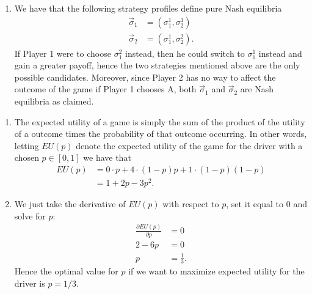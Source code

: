 \documentclass[a4paper]{article}
\begin{document}
\begin{exercise}{3}
\begin{enumerate}[label=(\alph*)]
    \item We have that the following strategy profiles define pure Nash equilibria
      \begin{align*}
        \vec{\sigma}_1 &= (\sigma_1^{1}, \sigma_2^{1}) \\
        \vec{\sigma}_2 &= (\sigma_1^{1}, \sigma_2^{2})
      .\end{align*}
      If Player 1 were to choose $ \sigma_1^{2} $ instead, then he could switch to $ \sigma_1^{1} $ instead and gain a greater payoff, hence the two strategies mentioned above are the only possible candidates. Moreover, since Player 2 has no way to affect the outcome of the game if Player 1 chooses A, both $ \vec{\sigma}_1 $ and $ \vec{\sigma}_2 $ are Nash equilibria as claimed.
  \end{enumerate}
\end{exercise}

\begin{exercise}{4}
  \begin{enumerate}[label=(\alph*)]
    \item The expected utility of a game is simply the sum of the product of the utility of a outcome times the probability of that outcome occurring. In other words, letting $ EU(p) $ denote the expected utility of the game for the driver with a chosen $ p \in [0, 1] $ we have that
    \begin{align*}
      EU(p) &= 0 \cdot p + 4 \cdot (1- p)p + 1 \cdot (1-p)(1-p) \\
            &= 1 + 2p - 3p^2
    .\end{align*}

    \item We just take the derivative of $ EU(p) $ with respect to $ p $, set it equal to $ 0 $ and solve for $ p $:
      \begin{align*}
        \frac{\partial EU(p)}{\partial p} &= 0 \\
        2 - 6p &= 0 \\
        p &= \frac{1}{3}.
      \end{align*}
      Hence the optimal value for $ p $ if we want to maximize expected utility for the driver is $ p=1/3 $.
  \end{enumerate}
\end{exercise}
\end{document}

